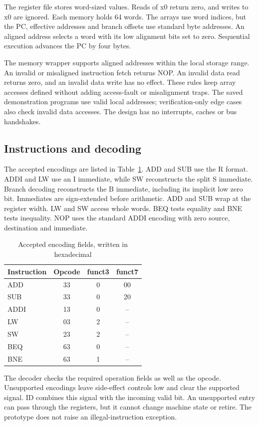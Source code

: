 \documentclass[conference]{IEEEtran}
\begin{document}
The register file stores word-sized values. Reads of x0 return zero, and writes to x0 are ignored. Each memory holds 64 words. The arrays use word indices, but the PC, effective addresses and branch offsets use standard byte addresses. An aligned address selects a word with its low alignment bits set to zero. Sequential execution advances the PC by four bytes.

The memory wrapper supports aligned addresses within the local storage range. An invalid or misaligned instruction fetch returns NOP. An invalid data read returns zero, and an invalid data write has no effect. These rules keep array accesses defined without adding access-fault or misalignment traps. The saved demonstration programs use valid local addresses; verification-only edge cases also check invalid data accesses. The design has no interrupts, caches or bus handshakes.

\subsection{Instructions and decoding}
The accepted encodings are listed in Table~\ref{tab:enc}. ADD and SUB use the R format. ADDI and LW use an I immediate, while SW reconstructs the split S immediate. Branch decoding reconstructs the B immediate, including its implicit low zero bit. Immediates are sign-extended before arithmetic. ADD and SUB wrap at the register width. LW and SW access whole words. BEQ tests equality and BNE tests inequality. NOP uses the standard ADDI encoding with zero source, destination and immediate.

\begin{table}[t]
\caption{Accepted encoding fields, written in hexadecimal}
\label{tab:enc}\centering
\begin{tabular}{lccc}\hline
Instruction & Opcode & funct3 & funct7\\\hline
ADD & 33 & 0 & 00\\
SUB & 33 & 0 & 20\\
ADDI & 13 & 0 & --\\
LW & 03 & 2 & --\\
SW & 23 & 2 & --\\
BEQ & 63 & 0 & --\\
BNE & 63 & 1 & --\\\hline
\end{tabular}
\end{table}

The decoder checks the required operation fields as well as the opcode. Unsupported encodings leave side-effect controls low and clear the supported signal. ID combines this signal with the incoming valid bit. An unsupported entry can pass through the registers, but it cannot change machine state or retire. The prototype does not raise an illegal-instruction exception.
\end{document}
